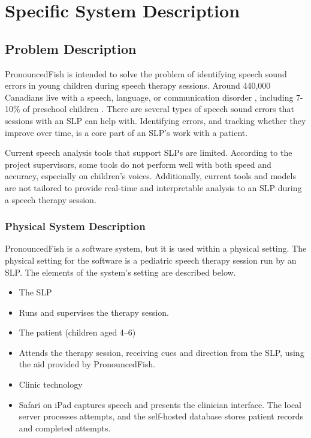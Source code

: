 \documentclass[12pt]{article}
\begin{document}
\section{Specific System Description} \label{sec:specific-system}

\subsection{Problem Description} \label{Sec_pd}

PronouncedFish is intended to solve the problem of identifying speech sound errors in young children during speech therapy sessions. 
Around 440,000 Canadians live with a speech, language, or communication disorder \cite{cdac2026statistics}, 
including 7-10\% of preschool children \cite{gaines2006earlyid}. 
There are several types of speech sound errors that sessions with an SLP can help with. Identifying errors, and tracking whether 
they improve over time, is a core part of an SLP's work with a patient.

Current speech analysis tools that support SLPs are limited. According to the project supervisors, some tools do not perform 
well with both speed and accuracy, especially on children's voices. Additionally, current tools and models are not tailored to 
provide real-time and interpretable analysis to an SLP during a speech therapy session. 

\subsubsection{Physical System Description} \label{sec_phySystDescrip}

PronouncedFish is a software system, but it is used within a physical setting. The physical setting for the software is a pediatric 
speech therapy session run by an SLP. 
The elements of the system's setting are described below.

\begin{itemize}

\item[PS1:] The SLP
\item Runs and supervises the therapy session.
\item[PS2:] The patient (children aged 4--6)
\item Attends the therapy session, receiving cues and direction from the SLP, using the aid provided by PronouncedFish.
\item[PS3:] Clinic technology
\item Safari on iPad captures speech and presents the clinician interface.
  The local server processes attempts, and the self-hosted database stores
  patient records and completed attempts.

\end{itemize}
\end{document}
